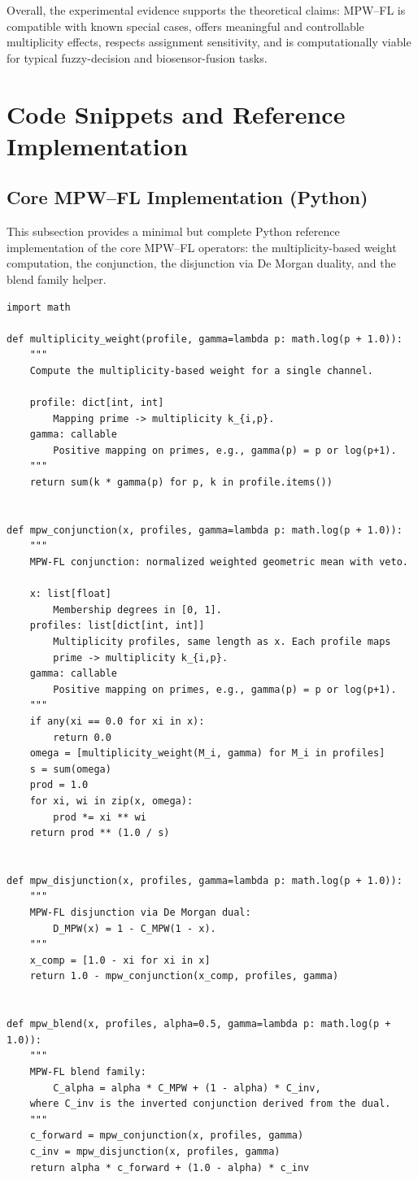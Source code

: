 \documentclass[11pt]{article}
\begin{document}
Overall, the experimental evidence supports the theoretical claims: MPW--FL is compatible with known special cases, offers meaningful and controllable multiplicity effects, respects assignment sensitivity, and is computationally viable for typical fuzzy-decision and biosensor-fusion tasks.

\section{Code Snippets and Reference Implementation}
\label{sec:code}

\subsection{Core MPW--FL Implementation (Python)}
\label{subsec:core-code}

This subsection provides a minimal but complete Python reference implementation of the core MPW--FL operators: the multiplicity-based weight computation, the conjunction, the disjunction via De Morgan duality, and the blend family helper.

\begin{verbatim}
import math

def multiplicity_weight(profile, gamma=lambda p: math.log(p + 1.0)):
    """
    Compute the multiplicity-based weight for a single channel.

    profile: dict[int, int]
        Mapping prime -> multiplicity k_{i,p}.
    gamma: callable
        Positive mapping on primes, e.g., gamma(p) = p or log(p+1).
    """
    return sum(k * gamma(p) for p, k in profile.items())


def mpw_conjunction(x, profiles, gamma=lambda p: math.log(p + 1.0)):
    """
    MPW-FL conjunction: normalized weighted geometric mean with veto.

    x: list[float]
        Membership degrees in [0, 1].
    profiles: list[dict[int, int]]
        Multiplicity profiles, same length as x. Each profile maps
        prime -> multiplicity k_{i,p}.
    gamma: callable
        Positive mapping on primes, e.g., gamma(p) = p or log(p+1).
    """
    if any(xi == 0.0 for xi in x):
        return 0.0
    omega = [multiplicity_weight(M_i, gamma) for M_i in profiles]
    s = sum(omega)
    prod = 1.0
    for xi, wi in zip(x, omega):
        prod *= xi ** wi
    return prod ** (1.0 / s)


def mpw_disjunction(x, profiles, gamma=lambda p: math.log(p + 1.0)):
    """
    MPW-FL disjunction via De Morgan dual:
        D_MPW(x) = 1 - C_MPW(1 - x).
    """
    x_comp = [1.0 - xi for xi in x]
    return 1.0 - mpw_conjunction(x_comp, profiles, gamma)


def mpw_blend(x, profiles, alpha=0.5, gamma=lambda p: math.log(p + 1.0)):
    """
    MPW-FL blend family:
        C_alpha = alpha * C_MPW + (1 - alpha) * C_inv,
    where C_inv is the inverted conjunction derived from the dual.
    """
    c_forward = mpw_conjunction(x, profiles, gamma)
    c_inv = mpw_disjunction(x, profiles, gamma)
    return alpha * c_forward + (1.0 - alpha) * c_inv
\end{verbatim}
\end{document}
